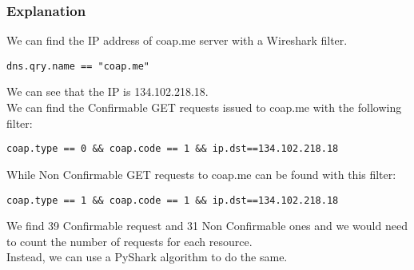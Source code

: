 \subsubsection{Explanation}
We can find the IP address of coap.me server with a Wireshark filter.
\begin{verbatim}
dns.qry.name == "coap.me"
\end{verbatim}
We can see that the IP is 134.102.218.18.\\

We can find the Confirmable GET requests issued to coap.me with the following filter:
\begin{verbatim}
coap.type == 0 && coap.code == 1 && ip.dst==134.102.218.18
\end{verbatim}
While Non Confirmable GET requests to coap.me can be found with this filter:
\begin{verbatim}
coap.type == 1 && coap.code == 1 && ip.dst==134.102.218.18
\end{verbatim}
We find 39 Confirmable request and 31 Non Confirmable ones and we would need to count the number of requests for each resource.\\
Instead, we can use a PyShark algorithm to do the same.

